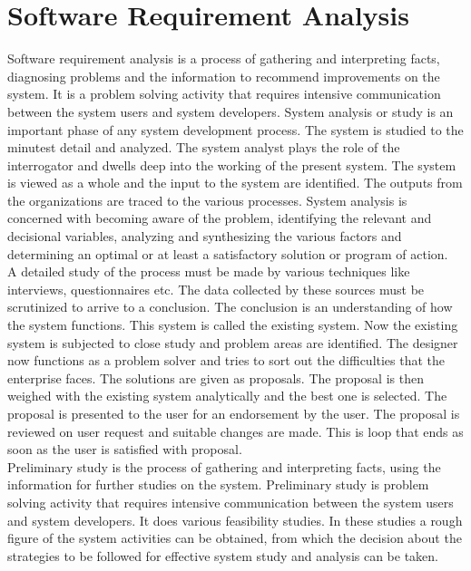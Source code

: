 \section{Software Requirement Analysis}
Software requirement analysis is a process of gathering and interpreting facts, diagnosing problems and the information to recommend improvements on the system. It is a problem solving activity that requires intensive communication between the system users and system developers. System analysis or study is an important phase of any system development process. The system is studied to the minutest detail and analyzed. The system analyst plays the role of the interrogator and dwells deep into the working of the present system. The system is viewed as a whole and the input to the system are identified. The outputs from the organizations are traced to the various processes. System analysis is concerned with becoming aware of the problem, identifying the relevant and decisional variables, analyzing and synthesizing the various factors and determining an optimal or at least a satisfactory solution or program of action.\\

\noindent A detailed study of the process must be made by various techniques like interviews, questionnaires etc. The data collected by these sources must be scrutinized to arrive to a conclusion. The conclusion is an understanding of how the system functions. This system is called the existing system. Now the existing system is subjected to close study and problem areas are identified. The designer now functions as a problem solver and tries to sort out the difficulties that the enterprise faces. The solutions are given as proposals. The proposal is then weighed with the existing system analytically and the best one is selected. The proposal is presented to the user for an endorsement by the user. The proposal is reviewed on user request and suitable changes are made. This is loop that ends as soon as the user is satisfied with proposal.\\

\noindent Preliminary study is the process of gathering and interpreting facts, using the information for further studies on the system. Preliminary study is problem solving activity that requires intensive communication between the system users and system developers. It does various feasibility studies. In these studies a rough figure of the system activities can be obtained, from which the decision about the strategies to be followed for effective system study and analysis can be taken.
